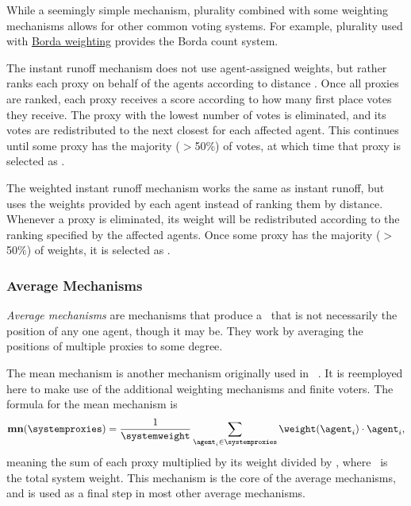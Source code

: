 While a seemingly simple mechanism, plurality combined with some
weighting mechanisms allows for other common voting systems.
For example, plurality used with \hyperref[para:borda]{Borda weighting}
provides the Borda count system.  

\label{para:cand-instant-runoff}
The instant runoff mechanism does not use agent-assigned weights, but rather
ranks each proxy on behalf of the agents according to distance .
Once all proxies are ranked, each proxy receives a score according to how
many first place votes they receive.
The proxy with the lowest number of votes is eliminated, and its votes are
redistributed to the next closest for each affected agent.
This continues until some proxy has the majority ($>$50\%) of votes, at which
time that proxy is selected as \systemtruth.  

\label{para:cand-weighted-instant-runoff}
\label{para:candidate-weighted-instant-runoff}
The weighted instant runoff mechanism works the same as instant runoff, but uses
the weights provided by each agent instead of ranking them by distance.
Whenever a proxy is eliminated, its weight will be redistributed according to
the ranking specified by the affected agents.
Once some proxy has the majority ($>$50\%) of weights, it is selected as
\systemtruth.

\subsubsection{Average Mechanisms}\label{subsubsec:average-mechanisms}
\textit{Average mechanisms} are mechanisms that produce a \systemtruth\ that
is not necessarily the position of any one agent, though it may be.
They work by averaging the positions of multiple proxies to some degree.

\label{para:mean}
The mean mechanism is another mechanism originally used in
~\cite{Cohensius2017}.
It is reemployed here to make use of the additional weighting mechanisms and
finite voters.
The formula for the mean mechanism is
\begin{equation*}
    \mathbf{mn}(\systemproxies) =
    \frac{1}{\systemweight}
    \sum_{\agent_i \in \systemproxies} {\weightof{\agent_i} \cdot \agent_i}
    \text{,}\label{eq:mean-mechanism}
\end{equation*}
meaning the sum of each proxy multiplied by its weight divided by
\systemweight, where \systemweight\ is the total system weight.
This mechanism is the core of the average mechanisms, and is used as a final
step in most other average mechanisms.

